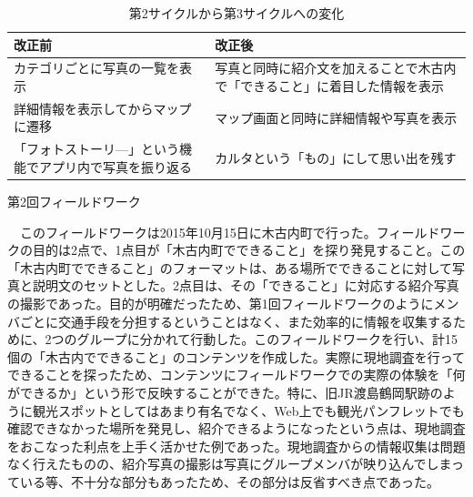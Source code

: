 \begin{table}[htb]
\centering
\addtocounter{table}{+0}
\caption{第2サイクルから第3サイクルへの変化}
  \begin{tabular}{|l|l|} \hline
    改正前&改正後  \\ \hline 
    \parbox{20zw}{カテゴリごとに写真の一覧を表示} & \parbox{20zw}{写真と同時に紹介文を加えることで木古内で「できること」に着目した情報を表示}\rule[-6mm]{0mm}{14mm} \\  \hline
    \parbox{20zw}{詳細情報を表示してからマップに遷移} &\parbox{20zw}{マップ画面と同時に詳細情報や写真を表示}\\ \hline
    \parbox{20zw}{「フォトストーリ—」という機能でアプリ内で写真を振り返る}\rule[-6mm]{0mm}{14mm} & \parbox{20zw}{カルタという「もの」にして思い出を残す}\\ \hline
  \end{tabular} 
\end{table}

\begin{description}
\item[第2回フィールドワーク]\mbox{}
\end{description}
　このフィールドワークは2015年10月15日に木古内町で行った。フィールドワークの目的は2点で、1点目が「木古内町でできること」を探り発見すること。この「木古内町でできること」のフォーマットは、ある場所でできることに対して写真と説明文のセットとした。2点目は、その「できること」に対応する紹介写真の撮影であった。目的が明確だったため、第1回フィールドワークのようにメンバごとに交通手段を分担するということはなく、また効率的に情報を収集するために、2つのグループに分かれて行動した。このフィールドワークを行い、計15個の「木古内でできること」のコンテンツを作成した。実際に現地調査を行ってできることを探ったため、コンテンツにフィールドワークでの実際の体験を「何ができるか」という形で反映することができた。特に、旧JR渡島鶴岡駅跡のように観光スポットとしてはあまり有名でなく、Web上でも観光パンフレットでも確認できなかった場所を発見し、紹介できるようになったという点は、現地調査をおこなった利点を上手く活かせた例であった。現地調査からの情報収集は問題なく行えたものの、紹介写真の撮影は写真にグループメンバが映り込んでしまっている等、不十分な部分もあったため、その部分は反省すべき点であった。

